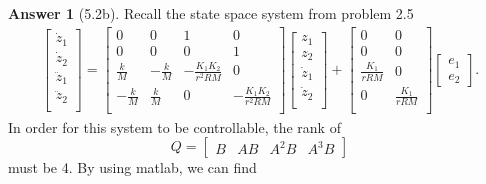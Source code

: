 \documentclass{article}
\theoremstyle{definition}
\newtheorem*{ans}{Answer}
\begin{document}
    \begin{ans}[5.2b]
        Recall the state space system from problem 2.5
        \begin{align*}
            \begin{bmatrix}
                \dot z_1 \\
                \dot z_2 \\
                \ddot z_1 \\
                \ddot z_2 \\
            \end{bmatrix}
            =
            \begin{bmatrix}
                0 & 0 & 1 & 0 \\
                0 & 0 & 0 & 1 \\
                \frac{k}{M} & -\frac{k}{M} & -\frac{K_1 K_2}{r^2 R M} & 0 \\
                -\frac{k}{M} & \frac{k}{M} &  0 & -\frac{K_1 K_2}{r^2 R M} \\
            \end{bmatrix}
            \begin{bmatrix}
                z_1 \\
                z_2 \\
                \dot z_1 \\
                \dot z_2 \\
            \end{bmatrix}
            +
            \begin{bmatrix}
                0 & 0 \\
                0 & 0 \\
                \frac{K_1}{rRM} & 0 \\
                0 & \frac{K_1}{rRM} \\
            \end{bmatrix}
            \begin{bmatrix}
                e_1 \\ e_2
            \end{bmatrix}
            .
        \end{align*}
        In order for this system to be controllable, 
        the rank of  
        \begin{equation*}
            Q = 
            \begin{bmatrix}
                B & AB & A^2 B & A^3 B
            \end{bmatrix}
        \end{equation*}
        must be 4.
        By using matlab, we can find

\end{ans}
\end{document}
